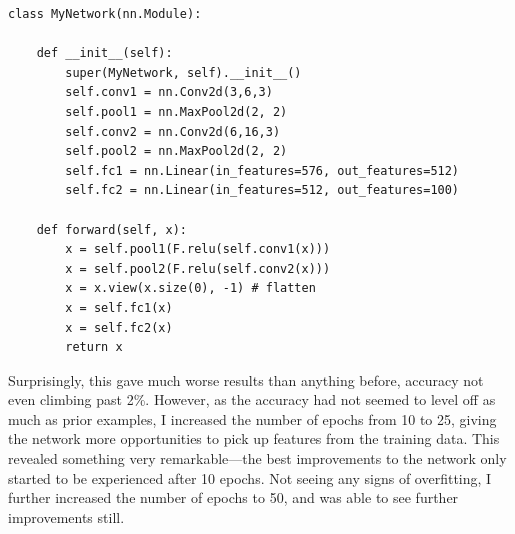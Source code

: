 \documentclass[11pt]{article}
\begin{document}
\begin{center}
\begin{small}
\begin{verbatim}
class MyNetwork(nn.Module):

    def __init__(self):
        super(MyNetwork, self).__init__()
        self.conv1 = nn.Conv2d(3,6,3)
        self.pool1 = nn.MaxPool2d(2, 2)
        self.conv2 = nn.Conv2d(6,16,3)
        self.pool2 = nn.MaxPool2d(2, 2)
        self.fc1 = nn.Linear(in_features=576, out_features=512)
        self.fc2 = nn.Linear(in_features=512, out_features=100)

    def forward(self, x):
        x = self.pool1(F.relu(self.conv1(x)))
        x = self.pool2(F.relu(self.conv2(x)))
        x = x.view(x.size(0), -1) # flatten
        x = self.fc1(x)
        x = self.fc2(x)
        return x
\end{verbatim}
\end{small}
\end{center}

Surprisingly, this gave much worse results than anything before, accuracy not even climbing past 2\%. However, as the accuracy had not seemed to level off as much as prior examples, I increased the number of epochs from 10 to 25, giving the network more opportunities to pick up features from the training data. This revealed something very remarkable---the best improvements to the network only started to be experienced after 10 epochs. Not seeing any signs of overfitting, I further increased the number of epochs to 50, and was able to see further improvements still.
\end{document}
